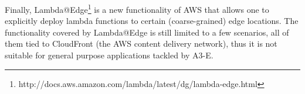 Finally, Lambda@Edge\footnote{http://docs.aws.amazon.com/lambda/latest/dg/lambda-edge.html} is a new functionality of AWS that allows one to explicitly deploy lambda functions to certain (coarse-grained) edge locations. The functionality covered by Lambda@Edge is still limited to a few scenarios, all of them tied to CloudFront (the AWS content delivery network), thus it is not suitable for general purpose applications tackled by A3-E. 


%










